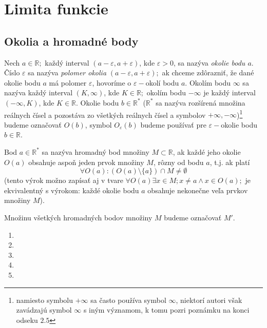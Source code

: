 \chapter{Limita funkcie}%

\section{Okolia a hromadné body}
Nech $a \in \mathbb{R};$ každý interval $(a-\varepsilon,a+\varepsilon)$, kde $\varepsilon > 0$, sa nazýva \textit{okolie bodu $a$}. Číslo $\varepsilon$ sa nazýva \textit{polomer okolia} $(a-\varepsilon,a+\varepsilon);$ ak chceme zdôrazniť, že dané okolie bodu $a$ má polomer $\varepsilon$, hovoríme o $\varepsilon-$okolí bodu $a$. Okolím bodu $\infty$ sa nazýva každý interval $(K,\infty)$, kde $K \in \mathbb{R};$ okolím bodu $- \infty$ je každý interval $(- \infty,K)$, kde $K \in \mathbb{R}.$ Okolie bodu $b \in \mathbb{R^*}$ ($\mathbb{R^*}$ sa nazýva rozšírená množina reálnych čísel a pozostáva zo všetkých reálnych čísel a symbolov $+\infty,-\infty$)\footnote{namiesto symbolu $+\infty$ sa často používa symbol $\infty$, niektorí autori však zavádzajú symbol $\infty$ s iným významom, k tomu pozri poznámku na konci odseku $2.5$} budeme označovať $O(b)$, symbol $O_\varepsilon (b)$ budeme používať pre $\varepsilon-$okolie bodu $b \in \mathbb{R}$.

Bod $a \in \mathbb{R^*}$ sa nazýva hromadný bod množiny $M \subset \mathbb{R}$, ak každé jeho okolie $O(a)$ obsahuje aspoň jeden prvok množiny $M$, rôzny od bodu $a$, t.j. ak platí 
$$\forall O(a): (O(a) \setminus \{ a \}) \cap M \neq \emptyset $$
(tento výrok možno zapísať aj v tvare $\forall O(a) \exists x \in M; x \neq a \wedge x \in O(a);$ je ekvivalentný s výrokom: každé okolie bodu $a$ obsahuje nekonečne veľa prvkov množiny $M$).

Množinu všetkých hromadných bodov množiny $M$ budeme označovať $M'$.

\begin{enumerate}[resume]
	\item {}
	\item {}
	\item {}
	\item {}
	\item {}
\end{enumerate}

